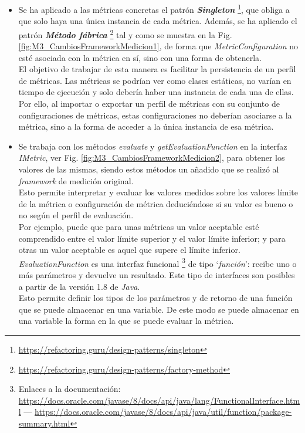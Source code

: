 \begin{itemize}
	\tightlist
	\item Se ha aplicado a las métricas concretas el patrón \textit{\textbf{Singleton}} \footnote{\url{https://refactoring.guru/design-patterns/singleton}}, que obliga a que solo haya una única instancia de cada métrica. Además, se ha aplicado el patrón \textit{\textbf{Método fábrica}} \footnote{\url{https://refactoring.guru/design-patterns/factory-method}} tal y como se muestra en la Fig. \ref{fig:M3_CambiosFrameworkMedicion1}, de forma que \textit{MetricConfiguration} no esté asociada con la métrica en sí, sino con una forma de obtenerla.\\
	El objetivo de trabajar de esta manera es facilitar la persistencia de un perfil de métricas. Las métricas se podrían ver como clases estáticas, no varían en tiempo de ejecución y solo debería haber una instancia de cada una de ellas. Por ello, al importar o exportar un perfil de métricas con su conjunto de configuraciones de métricas, estas configuraciones no deberían asociarse a la métrica, sino a la forma de acceder a la única instancia de esa métrica. 
	\item Se trabaja con los métodos \textit{evaluate} y \textit{getEvaluationFunction} en la interfaz \textit{IMetric}, ver Fig. \ref{fig:M3_CambiosFrameworkMedicion2}, para obtener los valores de las mismas, siendo estos métodos un añadido que se realizó al \textit{framework} de medición original.\\
	Esto permite interpretar y evaluar los valores medidos sobre los valores límite de la métrica o configuración de métrica deduciéndose si su valor es bueno o no según el perfil de evaluación.\\
	 Por ejemplo, puede que para unas métricas un valor aceptable esté comprendido entre el valor límite superior y el valor límite inferior; y para otras un valor aceptable es aquel que supere el límite inferior.\\
	\textit{EvaluationFunction} es una interfaz funcional \footnote{Enlaces a la documentación: \url{https://docs.oracle.com/javase/8/docs/api/java/lang/FunctionalInterface.html} --- \url{https://docs.oracle.com/javase/8/docs/api/java/util/function/package-summary.html}} 
	de tipo `\textit{función}': recibe uno o más parámetros y devuelve un resultado. Este tipo de interfaces son posibles a partir de la versión 1.8 de \textit{Java}.\\
	Esto permite definir los tipos de los parámetros y de retorno de una función que se puede almacenar en una variable. De este modo se puede almacenar en una variable la forma en la que se puede evaluar la métrica.
\end{itemize}

